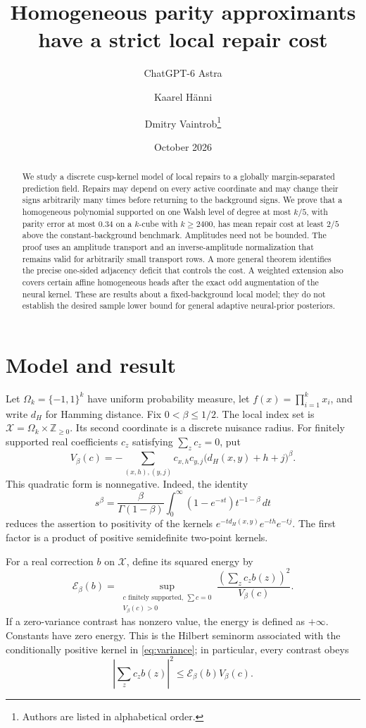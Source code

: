 \documentclass[11pt]{article}
\title{Homogeneous parity approximants have a strict local repair cost}
\author{ChatGPT-6 Astra \and Kaarel H\"anni \and Dmitry Vaintrob\thanks{Authors are listed in alphabetical order.}}
\date{October 2026}
\newcommand{\1}{\mathbf 1}
\newcommand{\cE}{\mathcal E}
\begin{document}
\maketitle
\begin{abstract}
We study a discrete cusp-kernel model of local repairs to a globally
margin-separated prediction field. Repairs may depend on every active
coordinate and may change their signs arbitrarily many times before
returning to the background signs. We prove that a homogeneous polynomial
supported on one Walsh level of degree at most $k/5$, with parity error
at most $0.34$ on a $k$-cube with $k\ge2400$, has mean repair cost at
least $2/5$ above the constant-background benchmark. Amplitudes
need not be bounded. The proof uses an amplitude transport and
an inverse-amplitude normalization that remains valid for arbitrarily
small transport rows. A more general theorem identifies the precise
one-sided adjacency deficit that controls the cost. A weighted extension
also covers certain affine homogeneous heads after the exact odd
augmentation of the neural kernel. These are results
about a fixed-background local model; they do not establish the desired
sample lower bound for general adaptive neural-prior posteriors.
\end{abstract}

\section{Model and result}
Let $\Omega_k=\{-1,1\}^k$ have uniform probability measure, let
$f(x)=\prod_{i=1}^k x_i$, and write $d_H$ for Hamming distance. Fix
$0<\beta\le1/2$. The local index set is
$\mathcal X=\Omega_k\times\mathbb Z_{\ge0}$. Its second coordinate is a
discrete nuisance radius. For finitely supported real coefficients
$c_z$ satisfying $\sum_zc_z=0$, put
\begin{equation}\label{eq:variance}
 V_\beta(c)=-\sum_{(x,h),(y,j)}c_{x,h}c_{y,j}
                    \bigl(d_H(x,y)+h+j\bigr)^\beta.
\end{equation}
This quadratic form is nonnegative. Indeed, the identity
\[
 s^\beta=\frac{\beta}{\Gamma(1-\beta)}
       \int_0^\infty(1-e^{-st})t^{-1-\beta}\,dt
\]
reduces the assertion to positivity of the kernels
$e^{-td_H(x,y)}e^{-th}e^{-tj}$. The first factor is a product of
positive semidefinite two-point kernels.

For a real correction $b$ on $\mathcal X$, define its squared energy by
\begin{equation}\label{eq:energy}
 \cE_\beta(b)=\sup_{\substack{c\text{ finitely supported},\ \sum c=0\\
                              V_\beta(c)>0}}
                  \frac{\left(\sum_zc_zb(z)\right)^2}{V_\beta(c)}.
\end{equation}
If a zero-variance contrast has nonzero value, the energy is defined as
$+\infty$. Constants have zero energy. This is the Hilbert seminorm
associated with the conditionally positive kernel in
\eqref{eq:variance}; in particular, every contrast obeys
\begin{equation}\label{eq:cs}
 \left|\sum_zc_zb(z)\right|^2\le\cE_\beta(b)V_\beta(c).
\end{equation}
\end{document}
